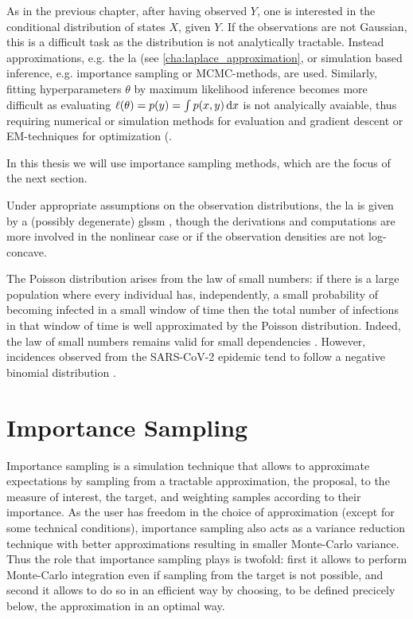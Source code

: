 As in the previous chapter, after having observed $Y$, one is interested in the conditional distribution of states $X$, given $Y$. If the observations are not Gaussian, this is a difficult task as the distribution is not analytically tractable. Instead approximations, e.g. the \gls{la} (see \cref{cha:laplace_approximation}, or simulation based inference, e.g. importance sampling or MCMC-methods, are used. Similarly, fitting hyperparameters $\theta$ by maximum likelihood inference becomes more difficult as evaluating $\ell(\theta) = p(y) = \int p(x,y) \,\mathrm d x$ is not analyically avaiable, thus requiring numerical or simulation methods for evaluation and  gradient descent or EM-techniques for optimization (.

In this thesis we will use importance sampling methods, which are the focus of the next section. 

Under appropriate assumptions on the observation distributions, the \gls{la} is given by a (possibly degenerate) \gls{glssm} \cite{Durbin1997Monte, Shephard1997Likelihood}, though the derivations and computations are more involved in the nonlinear case or if the observation densities are not log-concave.

\begin{theorem}
    
\end{theorem}

The Poisson distribution arises from the law of small numbers: if there is a large population where every individual has, independently, a small probability of becoming infected in a small window of time then the total number of infections in that window of time is well approximated by the Poisson distribution.
Indeed, the law of small numbers remains valid for small dependencies \cite{Ross2011Fundamentalsa,Arratia1990Poisson}.
However, incidences observed from the SARS-CoV-2 epidemic tend to follow a negative binomial distribution \cite{Chan2021Count}. 



\section{Importance Sampling}
\label{sec:importance_sampling}
Importance sampling is a simulation technique that allows to approximate expectations by sampling from a tractable approximation, the proposal, to the measure of interest, the target, and weighting samples according to their importance. As the user has freedom in the choice of approximation (except for some technical conditions), importance sampling also acts as a variance reduction technique with better approximations resulting in smaller Monte-Carlo variance. Thus the role that importance sampling plays is twofold: first it allows to perform Monte-Carlo integration even if sampling from the target is not possible, and second it allows to do so in an efficient way by choosing, to be defined precicely below, the approximation in an optimal way.

